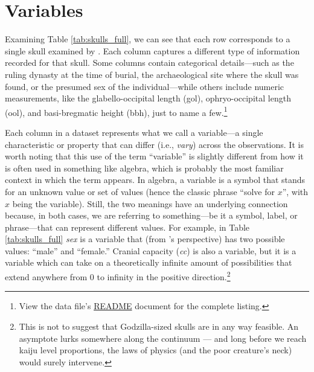 \section{Variables}

Examining Table \ref{tab:skulls_full}, we can see that each row corresponds to a single skull examined by \textcite{Thomson1905}. Each column captures a different type of information recorded for that skull. Some columns contain categorical details—such as the ruling dynasty at the time of burial, the archaeological site where the skull was found, or the presumed sex of the individual—while others include numeric measurements, like the glabello-occipital length (gol), ophryo-occipital length (ool), and basi-bregmatic height (bbh), just to name a few.\footnote{View the data file's \href{https://github.com/statistical-grimoire/thomson-randallmaciver-1905}{README} document for the complete listing.}

Each column in a dataset represents what we call a \gls{variable}—a single characteristic or property that can differ (i.e., \textit{vary}) across the observations. It is worth noting that this use of the term ``variable'' is slightly different from how it is often used in something like algebra, which is probably the most familiar context in which the term appears. In algebra, a variable is a symbol that stands for an unknown value or set of values (hence the classic phrase ``solve for $x$'', with $x$ being the variable). Still, the two meanings have an underlying connection because, in both cases, we are referring to something—be it a symbol, label, or phrase—that can represent different values. For example, in Table \ref{tab:skulls_full} \textit{sex} is a variable that (from \citeauthor{Thomson1905}'s perspective) has two possible values: ``male'' and ``female.''  Cranial capacity (\textit{cc}) is also a variable, but it is a variable which can take on a theoretically infinite amount of possibilities that extend anywhere from 0 to infinity in the positive direction.\footnote{This is not to suggest that Godzilla-sized skulls are in any way feasible. An asymptote lurks somewhere along the continuum — and long before we reach kaiju level proportions, the laws of physics (and the poor creature’s neck) would surely intervene.}

